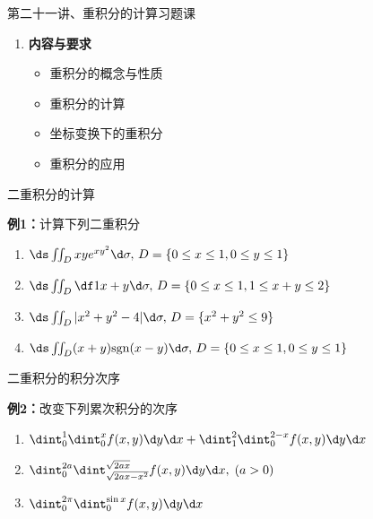 
\begin{frame}{第二十一讲、重积分的计算习题课}
	\linespread{1.5}
	\begin{enumerate}
	  \item {\bf 内容与要求}%
	  \begin{itemize}
		\item 重积分的概念与性质
		\item 重积分的计算
		\item 坐标变换下的重积分
	    \item 重积分的应用
	  \vspace{1em}
	  \end{itemize}
	\end{enumerate}
\end{frame}

\begin{frame}{二重积分的计算}
	\linespread{1.5}\pause 
	\begin{exampleblock}{{\bf 例1：}计算下列二重积分\hfill}\pause 
		\begin{enumerate}
		  \item $\ds\iint_Dxye^{xy^2}\d\sigma,\,D=\{0\leq x\leq 1,0\leq
		  y\leq 1\}$\pause 
		  \item $\ds\iint_D\df 1{x+y}\d\sigma,\,D=\{0\leq x\leq 1,1\leq x+y\leq
		  2\}$\pause 
		  \item $\ds\iint_D|x^2+y^2-4|\d\sigma,\,D=\{x^2+y^2\leq 9\}$\pause 
		  \item $\ds\iint_D(x+y)\mathrm{sgn}(x-y)\d\sigma,\,D=\{0\leq x\leq 1,0\leq
		  y\leq 1\}$
		\end{enumerate}
	\end{exampleblock}
\end{frame}

\begin{frame}{二重积分的积分次序}
	\linespread{1.2}\pause 
	\begin{exampleblock}{{\bf 例2：}改变下列累次积分的次序\hfill}\pause 
		\begin{enumerate}
		  \item $\dint_0^1\dint_0^xf(x,y)\d
		  y\d x+\dint_1^2\dint_0^{2-x}f(x,y)\d y\d x$\pause
		  \item $\dint_0^{2a}\dint_{\sqrt{2ax-x^2}}^{\sqrt{2ax}}
		  f(x,y)\d y\d x,\;(a>0)$\pause 
		  \item $\dint_0^{2\pi}\dint_0^{\sin x}f(x,y)\d y\d x$
		\end{enumerate}
	\end{exampleblock}
\end{frame}

